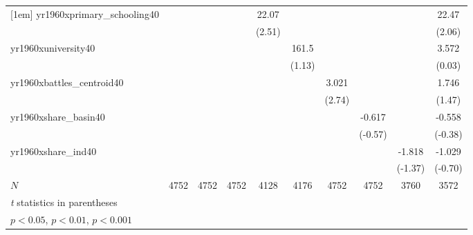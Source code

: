 {\begin{tabular}{l*{9}{c}}
[1em]
yr1960xprimary\_schooling40&                     &                     &                     &       22.07\sym{*}  &                     &                     &                     &                     &       22.47\sym{*}  \\
            &                     &                     &                     &      (2.51)         &                     &                     &                     &                     &      (2.06)         \\
[1em]
yr1960xuniversity40&                     &                     &                     &                     &       161.5         &                     &                     &                     &       3.572         \\
            &                     &                     &                     &                     &      (1.13)         &                     &                     &                     &      (0.03)         \\
[1em]
yr1960xbattles\_centroid40&                     &                     &                     &                     &                     &       3.021\sym{**} &                     &                     &       1.746         \\
            &                     &                     &                     &                     &                     &      (2.74)         &                     &                     &      (1.47)         \\
[1em]
yr1960xshare\_basin40&                     &                     &                     &                     &                     &                     &      -0.617         &                     &      -0.558         \\
            &                     &                     &                     &                     &                     &                     &     (-0.57)         &                     &     (-0.38)         \\
[1em]
yr1960xshare\_ind40&                     &                     &                     &                     &                     &                     &                     &      -1.818         &      -1.029         \\
            &                     &                     &                     &                     &                     &                     &                     &     (-1.37)         &     (-0.70)         \\
\hline
\(N\)       &        4752         &        4752         &        4752         &        4128         &        4176         &        4752         &        4752         &        3760         &        3572         \\
\hline\hline
\multicolumn{10}{l}{\footnotesize \textit{t} statistics in parentheses}\\
\multicolumn{10}{l}{\footnotesize \sym{*} \(p<0.05\), \sym{**} \(p<0.01\), \sym{***} \(p<0.001\)}\\
\end{tabular}
}
